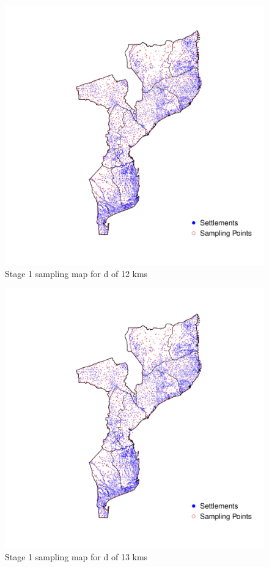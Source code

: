 \documentclass[
  12pt,
  a4paper]{article}
\begin{document}
\begin{figure}[H]

{\centering \includegraphics{mozambiqueNotes_files/figure-latex/stage1plot12-1} 

}

\caption{Stage 1 sampling map for d of 12 kms}\label{fig:stage1plot12}
\end{figure}

\begin{figure}[H]

{\centering \includegraphics{mozambiqueNotes_files/figure-latex/stage1plot13-1} 

}

\caption{Stage 1 sampling map for d of 13 kms}\label{fig:stage1plot13}
\end{figure}
\end{document}
